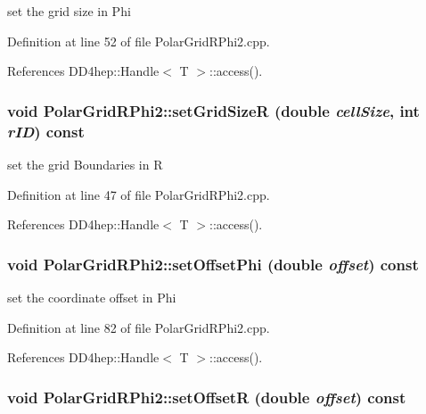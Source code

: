 set the grid size in Phi 

Definition at line 52 of file PolarGridRPhi2.cpp.

References DD4hep::Handle$<$ T $>$::access().\hypertarget{class_d_d4hep_1_1_geometry_1_1_polar_grid_r_phi2_a4258086fe98603df2cda311d2f11cbbe}{
\subsubsection[{setGridSizeR}]{\setlength{\rightskip}{0pt plus 5cm}void PolarGridRPhi2::setGridSizeR (double {\em cellSize}, \/  int {\em rID}) const}}
\label{class_d_d4hep_1_1_geometry_1_1_polar_grid_r_phi2_a4258086fe98603df2cda311d2f11cbbe}


set the grid Boundaries in R 

Definition at line 47 of file PolarGridRPhi2.cpp.

References DD4hep::Handle$<$ T $>$::access().\hypertarget{class_d_d4hep_1_1_geometry_1_1_polar_grid_r_phi2_a61ceeca1d68f2aa8e58054de24e3e1b1}{
\subsubsection[{setOffsetPhi}]{\setlength{\rightskip}{0pt plus 5cm}void PolarGridRPhi2::setOffsetPhi (double {\em offset}) const}}
\label{class_d_d4hep_1_1_geometry_1_1_polar_grid_r_phi2_a61ceeca1d68f2aa8e58054de24e3e1b1}


set the coordinate offset in Phi 

Definition at line 82 of file PolarGridRPhi2.cpp.

References DD4hep::Handle$<$ T $>$::access().\hypertarget{class_d_d4hep_1_1_geometry_1_1_polar_grid_r_phi2_a38a159e048f10cae3ed2175abc02faec}{
\subsubsection[{setOffsetR}]{\setlength{\rightskip}{0pt plus 5cm}void PolarGridRPhi2::setOffsetR (double {\em offset}) const}}
\label{class_d_d4hep_1_1_geometry_1_1_polar_grid_r_phi2_a38a159e048f10cae3ed2175abc02faec}


